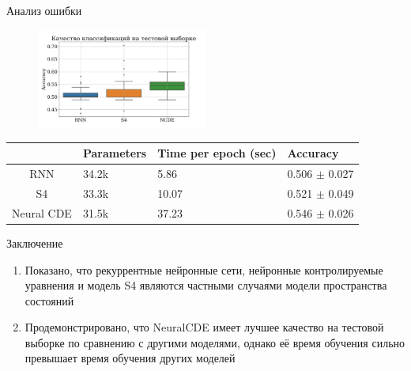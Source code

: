 \documentclass[10pt,pdf,hyperref={unicode}]{beamer}
\begin{document}
\begin{frame}{Анализ ошибки}
	\begin{figure}
		\includegraphics[width=0.5\textwidth]{rnn-s4-ncde.png}
	\end{figure}

	\begin{table}
		\begin{tabular}{c|l|l|l|}
			\cline{2-4}
			\multicolumn{1}{l|}{}  & Parameters & Time per epoch (sec) & Accuracy \\ \hline
			\multicolumn{1}{|c|}{RNN} & 34.2k & 5.86 & 0.506 $\pm$ 0.027 \\ \hline
			\multicolumn{1}{|c|}{S4} & 33.3k & 10.07 & 0.521 $\pm$ 0.049 \\ \hline
			\multicolumn{1}{|c|}{Neural CDE} & 31.5k & 37.23 & 0.546 $\pm$ 0.026 \\ \hline
		\end{tabular}
	\end{table}
\end{frame}

\begin{frame}{Заключение}
	\begin{enumerate}
		\item[1] Показано, что рекуррентные нейронные сети, нейронные контролируемые уравнения и модель S4 являются частными случаями модели пространства состояний
		
		\item[2] Продемонстрировано, что NeuralCDE имеет лучшее качество на тестовой выборке по сравнению с другими моделями, однако её время обучения сильно превышает время обучения других моделей
	\end{enumerate}
\end{frame}
\end{document}
